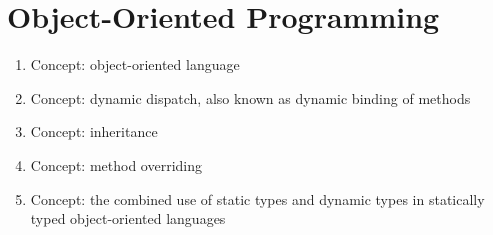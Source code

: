 \section{Object-Oriented Programming}\label{sec:OOP}

\begin{enumerate}[noitemsep]
\item Concept: object-oriented language
\item Concept: dynamic dispatch, also known as dynamic binding of methods
\item Concept: inheritance
\item Concept: method overriding
\item Concept: the combined use of static types and dynamic types in statically typed object-oriented languages
\end{enumerate}

